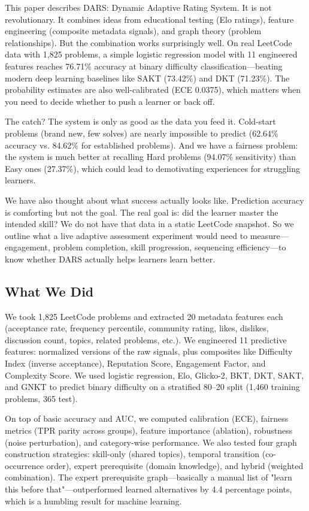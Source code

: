 \documentclass[conference]{IEEEtran}
\begin{document}
This paper describes DARS: Dynamic Adaptive Rating System. It is not revolutionary. It combines ideas from educational testing (Elo ratings), feature engineering (composite metadata signals), and graph theory (problem relationships). But the combination works surprisingly well. On real LeetCode data with 1,825 problems, a simple logistic regression model with 11 engineered features reaches 76.71\% accuracy at binary difficulty classification—beating modern deep learning baselines like SAKT (73.42\%) and DKT (71.23\%). The probability estimates are also well-calibrated (ECE 0.0375), which matters when you need to decide whether to push a learner or back off.

The catch? The system is only as good as the data you feed it. Cold-start problems (brand new, few solves) are nearly impossible to predict (62.64\% accuracy vs. 84.62\% for established problems). And we have a fairness problem: the system is much better at recalling Hard problems (94.07\% sensitivity) than Easy ones (27.37\%), which could lead to demotivating experiences for struggling learners.

We have also thought about what success actually looks like. Prediction accuracy is comforting but not the goal. The real goal is: did the learner master the intended skill? We do not have that data in a static LeetCode snapshot. So we outline what a live adaptive assessment experiment would need to measure—engagement, problem completion, skill progression, sequencing efficiency—to know whether DARS actually helps learners learn better.

\subsection{What We Did}

We took 1,825 LeetCode problems and extracted 20 metadata features each (acceptance rate, frequency percentile, community rating, likes, dislikes, discussion count, topics, related problems, etc.). We engineered 11 predictive features: normalized versions of the raw signals, plus composites like Difficulty Index (inverse acceptance), Reputation Score, Engagement Factor, and Complexity Score. We used logistic regression, Elo, Glicko-2, BKT, DKT, SAKT, and GNKT to predict binary difficulty on a stratified 80--20 split (1,460 training problems, 365 test). 

On top of basic accuracy and AUC, we computed calibration (ECE), fairness metrics (TPR parity across groups), feature importance (ablation), robustness (noise perturbation), and category-wise performance. We also tested four graph construction strategies: skill-only (shared topics), temporal transition (co-occurrence order), expert prerequisite (domain knowledge), and hybrid (weighted combination). The expert prerequisite graph—basically a manual list of "learn this before that"—outperformed learned alternatives by 4.4 percentage points, which is a humbling result for machine learning.
\end{document}
